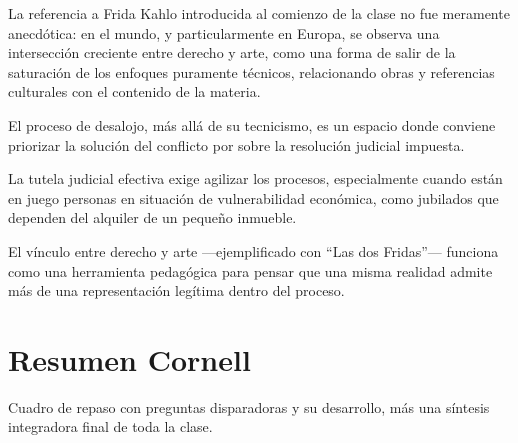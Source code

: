 \documentclass[12pt,oneside]{book}
\begin{document}
La referencia a Frida Kahlo introducida al comienzo de la clase no fue meramente anecdótica: en el mundo, y particularmente en Europa, se observa una intersección creciente entre derecho y arte, como una forma de salir de la saturación de los enfoques puramente técnicos, relacionando obras y referencias culturales con el contenido de la materia.

\begin{important}
El proceso de desalojo, más allá de su tecnicismo, es un espacio donde conviene priorizar la solución del conflicto por sobre la resolución judicial impuesta.

La tutela judicial efectiva exige agilizar los procesos, especialmente cuando están en juego personas en situación de vulnerabilidad económica, como jubilados que dependen del alquiler de un pequeño inmueble.

El vínculo entre derecho y arte ---ejemplificado con ``Las dos Fridas''--- funciona como una herramienta pedagógica para pensar que una misma realidad admite más de una representación legítima dentro del proceso.
\end{important}

\clearpage
\chapter*{Resumen Cornell}

Cuadro de repaso con preguntas disparadoras y su desarrollo, más una síntesis integradora final de toda la clase.
\end{document}
